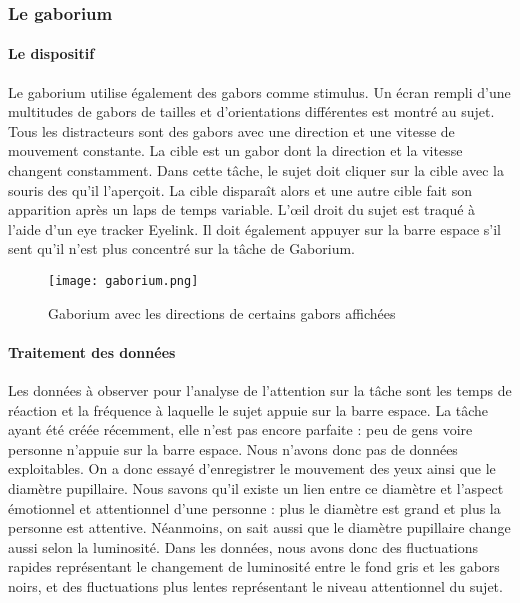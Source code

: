 \subsubsection{Le gaborium}

\paragraph{Le dispositif}Le gaborium utilise également des \glspl{gabor} comme stimulus. Un écran rempli d'une multitudes de gabors de tailles et d'orientations différentes est montré
au sujet. Tous les distracteurs sont des gabors avec une direction et une vitesse de mouvement constante. La cible est un gabor dont la direction et la vitesse changent constamment.
Dans cette tâche, le sujet doit cliquer sur la cible avec la souris des qu'il l'aperçoit. La cible disparaît alors et une autre cible fait son apparition après un laps de temps
variable. L'œil droit du sujet est traqué à l'aide d'un eye tracker Eyelink. Il doit également appuyer sur la barre espace s'il sent qu'il n'est plus concentré sur la tâche de Gaborium.

\begin{figure}[H]
    \begin{center}
    \texttt{[image: gaborium.png]}
    \end{center}
    \caption{Gaborium avec les directions de certains gabors affichées}
\label{Gaborium}
\end{figure}

\paragraph{Traitement des données}Les données à observer pour l'analyse de l'attention sur la tâche sont les temps de réaction et la fréquence à laquelle le sujet appuie sur la barre
espace. La tâche ayant été créée récemment, elle n'est pas encore parfaite : peu de gens voire personne n'appuie sur la barre espace. Nous n'avons donc pas de données exploitables.
On a donc essayé d'enregistrer le mouvement des yeux ainsi que le diamètre pupillaire. Nous savons qu'il existe un lien entre ce diamètre et l'aspect émotionnel et attentionnel d'une
personne : plus le diamètre est grand et plus la personne est attentive. Néanmoins, on sait aussi que le diamètre pupillaire change aussi selon la luminosité. Dans les données, nous
avons donc des fluctuations rapides représentant le changement de luminosité entre le fond gris et les gabors noirs, et des fluctuations plus lentes représentant le niveau attentionnel
du sujet.